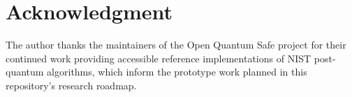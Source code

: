 \documentclass[conference]{IEEEtran}
\begin{document}
\section*{Acknowledgment}

The author thanks the maintainers of the Open Quantum Safe project
\cite{liboqs} for their continued work providing accessible reference
implementations of NIST post-quantum algorithms, which inform the
prototype work planned in this repository's research roadmap.



\end{document}

